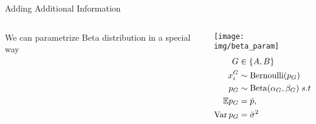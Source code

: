 \documentclass{beamer}
\begin{document}
\begin{frame}{Adding Additional Information}
    \begin{columns}
    \begin{column}{0.5\linewidth}
    We can parametrize Beta distribution in a special way
    \end{column}
    \begin{column}{0.5\linewidth}
    \texttt{[image: img/beta\_param]}
    \begin{align*}
        G &\in \{A, B\}\\
        x^G_i & \sim \operatorname{Bernoulli}(p_G)\\
        p_G &\sim \operatorname{Beta}(\alpha_G, \beta_G)\;s.t. \\
        \mathbb{E} p_G &= \bar p, \\
        \operatorname{Var} p_G &= \bar \sigma^2
    \end{align*}
    \end{column}
    \end{columns}
\end{frame}
\end{document}
